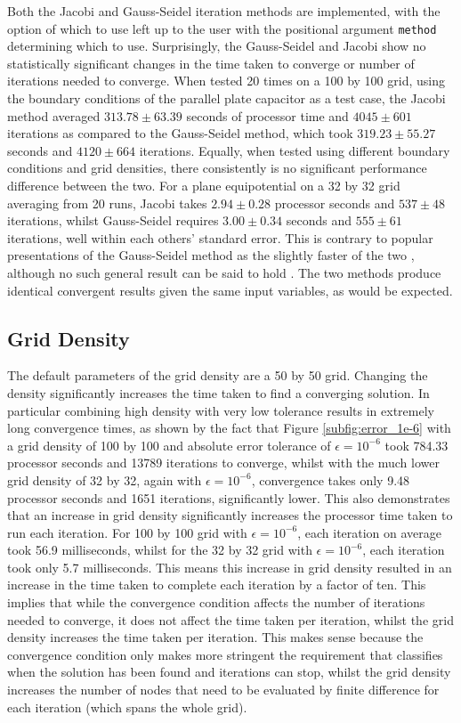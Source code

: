 Both the Jacobi and Gauss-Seidel iteration methods are implemented, with the option of which to use left up to the user with the positional argument \texttt{method} determining which to use. Surprisingly, the Gauss-Seidel and Jacobi show no statistically significant changes in the time taken to converge or number of iterations needed to converge. When tested 20 times on a 100 by 100 grid, using the boundary conditions of the parallel plate capacitor as a test case, the Jacobi method averaged $313.78 \pm 63.39$ seconds of processor time and $4045 \pm 601$ iterations as compared to the Gauss-Seidel method, which took $319.23 \pm 55.27$ seconds and $4120 \pm 664$ iterations. Equally, when tested using different boundary conditions and grid densities, there consistently is no significant performance difference between the two. For a plane equipotential on a 32 by 32 grid averaging from 20 runs, Jacobi takes $2.94 \pm 0.28$ processor seconds and $537 \pm 48$ iterations, whilst Gauss-Seidel requires $3.00 \pm 0.34$ seconds and $555 \pm 61$ iterations, well within each others' standard error. This is contrary to popular presentations of the Gauss-Seidel method as the slightly faster of the two \cite{edwards2004,golub1996}, although no such general result can be said to hold \cite{demmel1997}. The two methods produce identical convergent results given the same input variables, as would be expected.
\subsection{Grid Density}
\label{subsec:grid_density}

The default parameters of the grid density are a 50 by 50 grid. Changing the density significantly increases the time taken to find a converging solution. In particular combining high density with very low tolerance results in extremely long convergence times, as shown by the fact that Figure \ref{subfig:error_1e-6} with a grid density of 100 by 100 and absolute error tolerance of $\epsilon = 10^{-6}$ took 784.33 processor seconds and 13789 iterations to converge, whilst with the much lower grid density of 32 by 32, again with $\epsilon = 10^{-6}$, convergence takes only 9.48 processor seconds and 1651 iterations, significantly lower. This also demonstrates that an increase in grid density significantly increases the processor time taken to run each iteration. For 100 by 100 grid with $\epsilon = 10^{-6}$, each iteration on average took 56.9 milliseconds, whilst for the 32 by 32 grid with $\epsilon = 10^{-6}$, each iteration took only 5.7 milliseconds. This means this increase in grid density resulted in an increase in the time taken to complete each iteration by a factor of ten. This implies that while the convergence condition affects the number of iterations needed to converge, it does not affect the time taken per iteration, whilst the grid density increases the time taken per iteration. This makes sense because the convergence condition only makes more stringent the requirement that classifies when the solution has been found and iterations can stop, whilst the grid density increases the number of nodes that need to be evaluated by finite difference for each iteration (which spans the whole grid).

